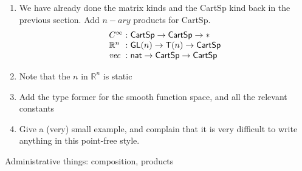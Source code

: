 \documentclass[preprint]{sigplanconf}
\theoremstyle{examplestyle}
\begin{document}
\begin{enumerate}
\item We have already done the matrix kinds and the CartSp kind back
  in the previous section. Add $n-ary$ products for CartSp.
  \begin{displaymath}
    \begin{array}{l@{\hspace{0.3em}}c@{\hspace{0.3em}}l}
      C^\infty &:& \mathsf{CartSp} \to \mathsf{CartSp} \to * \\
      \mathbb{R}^n &:& \mathsf{GL}(n) \to \mathsf{T}(n) \to \mathsf{CartSp} \\
      \mathit{vec} &:& \mathsf{nat} \to \mathsf{CartSp} \to \mathsf{CartSp}
    \end{array}
\end{displaymath}
\item Note that the $n$ in $\mathbb{R}^n$ is static
\item Add the type former for the smooth function space, and all the
  relevant constants
\item Give a (very) small example, and complain that it is very
  difficult to write anything in this point-free style.
\end{enumerate}

Administrative things: composition, products
\end{document}
